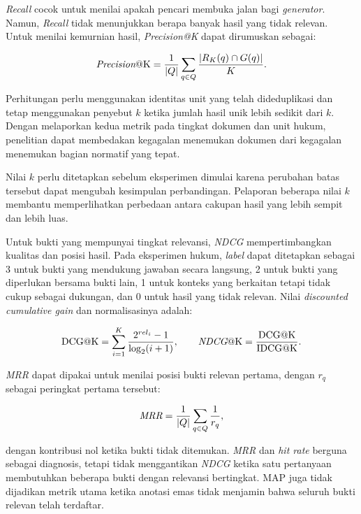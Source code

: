 \emph{Recall} cocok untuk menilai apakah pencari membuka jalan bagi \emph{generator}. Namun, \emph{Recall} tidak menunjukkan berapa banyak hasil yang tidak relevan. Untuk menilai kemurnian hasil, \emph{Precision@K} dapat dirumuskan sebagai:

\begin{equation}
    \operatorname{\emph{Precision}@K}=\frac{1}{|Q|}\sum_{q\in Q}
    \frac{|R_K(q)\cap G(q)|}{K}.
\end{equation}

Perhitungan perlu menggunakan identitas unit yang telah dideduplikasi dan tetap menggunakan penyebut $k$ ketika jumlah hasil unik lebih sedikit dari $k$. Dengan melaporkan kedua metrik pada tingkat dokumen dan unit hukum, penelitian dapat membedakan kegagalan menemukan dokumen dari kegagalan menemukan bagian normatif yang tepat.

Nilai $k$ perlu ditetapkan sebelum eksperimen dimulai karena perubahan batas tersebut dapat mengubah kesimpulan perbandingan. Pelaporan beberapa nilai $k$ membantu memperlihatkan perbedaan antara cakupan hasil yang lebih sempit dan lebih luas.

Untuk bukti yang mempunyai tingkat relevansi, \emph{NDCG} mempertimbangkan kualitas dan posisi hasil. Pada eksperimen hukum, \emph{label} dapat ditetapkan sebagai 3 untuk bukti yang mendukung jawaban secara langsung, 2 untuk bukti yang diperlukan bersama bukti lain, 1 untuk konteks yang berkaitan tetapi tidak cukup sebagai dukungan, dan 0 untuk hasil yang tidak relevan. Nilai \emph{discounted cumulative gain} dan normalisasinya adalah:

\begin{equation}
    \operatorname{DCG@K}=\sum_{i=1}^{K}\frac{2^{rel_i}-1}{\log_2(i+1)},
    \qquad
    \operatorname{\emph{NDCG}@K}=\frac{\operatorname{DCG@K}}{\operatorname{IDCG@K}}.
\end{equation}

\emph{MRR} dapat dipakai untuk menilai posisi bukti relevan pertama, dengan $r_q$ sebagai peringkat pertama tersebut:

\begin{equation}
    \operatorname{\emph{MRR}}=\frac{1}{|Q|}\sum_{q\in Q}\frac{1}{r_q},
\end{equation}

dengan kontribusi nol ketika bukti tidak ditemukan. \emph{MRR} dan \emph{hit rate} berguna sebagai diagnosis, tetapi tidak menggantikan \emph{NDCG} ketika satu pertanyaan membutuhkan beberapa bukti dengan relevansi bertingkat. MAP juga tidak dijadikan metrik utama ketika anotasi emas tidak menjamin bahwa seluruh bukti relevan telah terdaftar.

